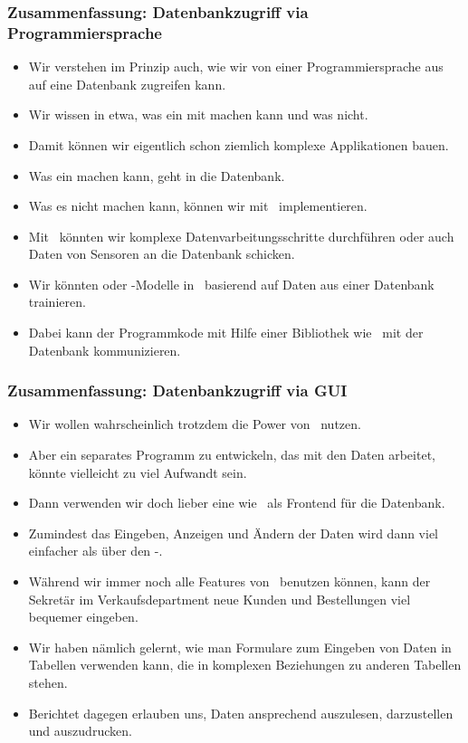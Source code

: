 \documentclass[aspectratio=169,mathserif,notheorems]{beamer}%
\begin{document}
%
\begin{frame}%
\frametitle{Zusammenfassung: Datenbankzugriff via Programmiersprache}%
\begin{itemize}%
\item Wir verstehen im Prinzip auch, wie wir von einer Programmiersprache aus auf eine Datenbank zugreifen kann.%
%
\item<2-> Wir wissen in etwa, was ein  mit  machen kann und was nicht.%
%
\item<3-> Damit können wir eigentlich schon ziemlich komplexe Applikationen bauen.%
%
\item<4-> Was ein  machen kann, geht in die Datenbank.%
%
\item<5-> Was es nicht machen kann, können wir mit \python\ implementieren.%
%
\item<6-> Mit \python\ könnten wir komplexe Datenvarbeitungsschritte durchführen oder auch Daten von Sensoren an die Datenbank schicken.%
%
\item<8-> Wir könnten  oder -Modelle in \python\ basierend auf Daten aus einer Datenbank trainieren.%
%
\item<9-> Dabei kann der Programmkode mit Hilfe einer Bibliothek wie \psycopg\ mit der Datenbank kommunizieren.%
\end{itemize}%
\end{frame}%
%
\begin{frame}%
\frametitle{Zusammenfassung: Datenbankzugriff via GUI}%
\begin{itemize}%
%
%
\item<2-> Wir wollen wahrscheinlich trotzdem die Power von \postgresql\ nutzen.%
%
\item<3-> Aber ein separates Programm zu entwickeln, das mit den Daten arbeitet, könnte vielleicht zu viel Aufwandt sein.%
%
\item<4-> Dann verwenden wir doch lieber eine  wie \libreofficeBase\ als Frontend für die Datenbank.%
%
\item<5-> Zumindest das Eingeben, Anzeigen und Ändern der Daten wird dann viel einfacher als über den \psql-.%
%
\item<6-> Während wir  immer noch alle Features von \postgresql\ benutzen können, kann der Sekretär im Verkaufsdepartment neue Kunden und Bestellungen viel bequemer eingeben.%
%
\item<7-> Wir haben nämlich gelernt, wie man Formulare zum Eingeben von Daten in Tabellen verwenden kann, die in komplexen Beziehungen zu anderen Tabellen stehen.%
%
\item<8-> Berichtet dagegen erlauben uns, Daten ansprechend auszulesen, darzustellen und auszudrucken.%
\end{itemize}%
\end{frame}%
\end{document}
